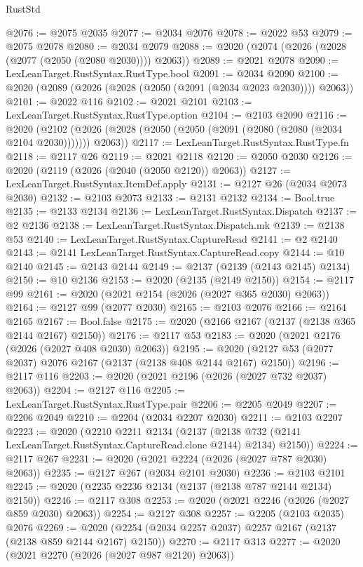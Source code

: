 \begin{lexlean}{RustStd}
\begin{coremodule}
@2076 := @2075 @2035
@2077 := @2034 @2076
@2078 := @2022 @53
@2079 := @2075 @2078
@2080 := @2034 @2079
@2088 := @2020 (@2074 (@2026 (@2028 (@2077 (@2050 (@2080 @2030)))) @2063))
@2089 := @2021 @2078
@2090 := LexLeanTarget.RustSyntax.RustType.bool
@2091 := @2034 @2090
@2100 := @2020 (@2089 (@2026 (@2028 (@2050 (@2091 (@2034 @2023 @2030)))) @2063))
@2101 := @2022 @116
@2102 := @2021 @2101
@2103 := LexLeanTarget.RustSyntax.RustType.option
@2104 := @2103 @2090
@2116 := @2020
    (@2102 (@2026 (@2028 (@2050 (@2050 (@2091 (@2080 (@2080 (@2034 @2104 @2030))))))) @2063))
@2117 := LexLeanTarget.RustSyntax.RustType.fn
@2118 := @2117 @26
@2119 := @2021 @2118
@2120 := @2050 @2030
@2126 := @2020 (@2119 (@2026 (@2040 (@2050 @2120)) @2063))
@2127 := LexLeanTarget.RustSyntax.ItemDef.apply
@2131 := @2127 @26 (@2034 @2073 @2030)
@2132 := @2103 @2073
@2133 := @2131 @2132
@2134 := Bool.true
@2135 := @2133 @2134
@2136 := LexLeanTarget.RustSyntax.Dispatch
@2137 := @2 @2136
@2138 := LexLeanTarget.RustSyntax.Dispatch.mk
@2139 := @2138 @53
@2140 := LexLeanTarget.RustSyntax.CaptureRead
@2141 := @2 @2140
@2143 := @2141 LexLeanTarget.RustSyntax.CaptureRead.copy
@2144 := @10 @2140
@2145 := @2143 @2144
@2149 := @2137 (@2139 (@2143 @2145) @2134)
@2150 := @10 @2136
@2153 := @2020 (@2135 (@2149 @2150))
@2154 := @2117 @99
@2161 := @2020 (@2021 @2154 (@2026 (@2027 @365 @2030) @2063))
@2164 := @2127 @99 (@2077 @2030)
@2165 := @2103 @2076
@2166 := @2164 @2165
@2167 := Bool.false
@2175 := @2020 (@2166 @2167 (@2137 (@2138 @365 @2144 @2167) @2150))
@2176 := @2117 @53
@2183 := @2020 (@2021 @2176 (@2026 (@2027 @408 @2030) @2063))
@2195 := @2020 (@2127 @53 (@2077 @2037) @2076 @2167 (@2137 (@2138 @408 @2144 @2167) @2150))
@2196 := @2117 @116
@2203 := @2020 (@2021 @2196 (@2026 (@2027 @732 @2037) @2063))
@2204 := @2127 @116
@2205 := LexLeanTarget.RustSyntax.RustType.pair
@2206 := @2205 @2049
@2207 := @2206 @2049
@2210 := @2204 (@2034 @2207 @2030)
@2211 := @2103 @2207
@2223 := @2020
    (@2210
      @2211
      @2134
      (@2137 (@2138 @732 (@2141 LexLeanTarget.RustSyntax.CaptureRead.clone @2144) @2134) @2150))
@2224 := @2117 @267
@2231 := @2020 (@2021 @2224 (@2026 (@2027 @787 @2030) @2063))
@2235 := @2127 @267 (@2034 @2101 @2030)
@2236 := @2103 @2101
@2245 := @2020 (@2235 @2236 @2134 (@2137 (@2138 @787 @2144 @2134) @2150))
@2246 := @2117 @308
@2253 := @2020 (@2021 @2246 (@2026 (@2027 @859 @2030) @2063))
@2254 := @2127 @308
@2257 := @2205 (@2103 @2035) @2076
@2269 := @2020 (@2254 (@2034 @2257 @2037) @2257 @2167 (@2137 (@2138 @859 @2144 @2167) @2150))
@2270 := @2117 @313
@2277 := @2020 (@2021 @2270 (@2026 (@2027 @987 @2120) @2063))

\end{coremodule}
\end{lexlean}
